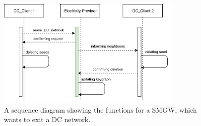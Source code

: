 \begin{figure}[tbp]
  \centering
  \includegraphics[width=0.8\textwidth]{images/Exit2.png}
  \caption[Sequence Diagram Exiting]{A sequence diagram showing the functions for a SMGW, which wants to exit a DC network.}
  \label{fig:Exit}

\end{figure}

